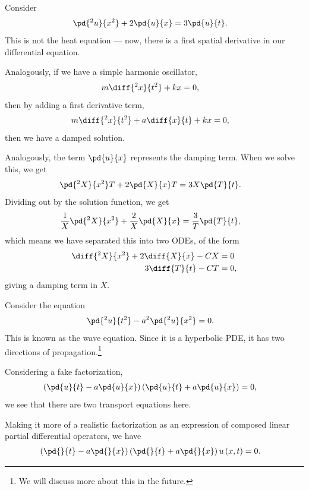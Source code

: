 \documentclass[10pt]{mypackage}
\begin{document}
\begin{example}
  Consider
  \begin{align*}
    \pd{^2u}{x^2} + 2 \pd{u}{x} &= 3 \pd{u}{t}.
  \end{align*}
  This is not the heat equation --- now, there is a first spatial derivative in our differential equation.\newline

  Analogously, if we have a simple harmonic oscillator,
  \begin{align*}
    m\diff{^2x}{t^2} + kx &= 0,
  \end{align*}
  then by adding a first derivative term,
  \begin{align*}
    m \diff{^2x}{t^2} + a \diff{x}{t} + kx &= 0,
  \end{align*}
  then we have a damped solution.\newline

  Analogously, the term $\pd{u}{x}$ represents the damping term. When we solve this, we get
  \begin{align*}
    \pd{^2X}{x^2}T + 2 \pd{X}{x}T &= 3X \pd{T}{t}.
  \end{align*}
  Dividing out by the solution function, we get
  \begin{align*}
    \frac{1}{X} \pd{^2X}{x^2} + \frac{2}{X} \pd{X}{x} &= \frac{3}{T} \pd{T}{t},
  \end{align*}
  which means we have separated this into two ODEs, of the form
  \begin{align*}
    \diff{^2X}{x^2} + 2\diff{X}{x} - CX &= 0\\
    3 \diff{T}{t} - CT &= 0,
  \end{align*}
  giving a damping term in $X$.
\end{example}
\begin{example}
  Consider the equation
  \begin{align*}
    \pd{^2u}{t^2} - a^2 \pd{^2u}{x^2} &= 0.
  \end{align*}
  This is known as the wave equation. Since it is a hyperbolic PDE, it has two directions of propagation.\footnote{We will discuss more about this in the future.}\newline

  Considering a fake factorization,
  \begin{align*}
    \left( \pd{u}{t} - a\pd{u}{x} \right)\left( \pd{u}{t} + a\pd{u}{x} \right) &= 0,
  \end{align*}
  we see that there are two transport equations here.\newline

  Making it more of a realistic factorization as an expression of composed linear partial differential operators, we have
  \begin{align*}
    \left( \pd{}{t} - a\pd{}{x} \right) \left( \pd{}{t} + a \pd{}{x} \right) u\left( x,t \right) &= 0.
  \end{align*}
\end{example}
\end{document}
